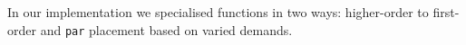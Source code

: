 In our implementation we specialised functions in two ways: higher-order to first-order
and \verb|par| placement based on varied demands.
